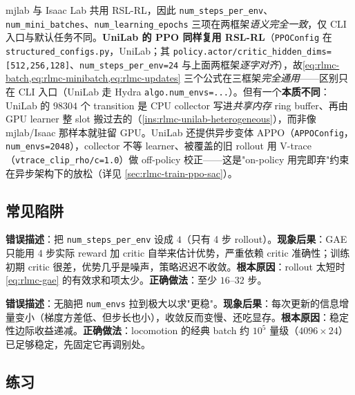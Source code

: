 mjlab 与 Isaac Lab 共用 RSL-RL，因此 \verb|num_steps_per_env|、\verb|num_mini_batches|、\verb|num_learning_epochs| 三项在两框架\emph{语义完全一致}，仅 CLI 入口与默认任务不同。\textbf{UniLab 的 PPO 同样复用 RSL-RL}（\verb|PPOConfig| 在 \verb|structured_configs.py|，UniLab；其 \verb|policy.actor/critic_hidden_dims=[512,256,128]|、\verb|num_steps_per_env=24| 与上面两框架\emph{逐字对齐}），故\cref{eq:rlmc-batch,eq:rlmc-minibatch,eq:rlmc-updates} 三个公式在三框架\emph{完全通用}——区别只在 CLI 入口（UniLab 走 Hydra \verb|algo.num_envs=...|）。但有一个\textbf{本质不同}：UniLab 的 $98304$ 个 transition 是 CPU collector 写进\emph{共享内存} ring buffer、再由 GPU learner 整 slot 搬过去的（\cref{ins:rlmc-unilab-heterogeneous}），而非像 mjlab/Isaac 那样本就驻留 GPU。UniLab 还提供异步变体 APPO（\verb|APPOConfig|，\verb|num_envs=2048|），collector 不等 learner、被覆盖的旧 rollout 用 V-trace（\verb|vtrace_clip_rho/c=1.0|）做 off-policy 校正——这是"on-policy 用完即弃"约束在异步架构下的放松（详见 \cref{sec:rlmc-train-ppo-sac}）。

\subsection{常见陷阱}

\begin{pitfall}
\textbf{错误描述}：把 \verb|num_steps_per_env| 设成 $4$（只有 4 步 rollout）。\textbf{现象后果}：GAE 只能用 4 步实际 reward 加 critic 自举来估计优势，严重依赖 critic 准确性；训练初期 critic 很差，优势几乎是噪声，策略迟迟不收敛。\textbf{根本原因}：rollout 太短时 \cref{eq:rlmc-gae} 的有效求和项太少。\textbf{正确做法}：至少 $16$--$32$ 步。
\end{pitfall}

\begin{pitfall}
\textbf{错误描述}：无脑把 \verb|num_envs| 拉到极大以求"更稳"。\textbf{现象后果}：每次更新的信息增量变小（梯度方差低、但步长也小），收敛反而变慢、还吃显存。\textbf{根本原因}：稳定性边际收益递减。\textbf{正确做法}：locomotion 的经典 batch 约 $10^5$ 量级（$4096\times24$）已足够稳定，先固定它再调别处。
\end{pitfall}

\subsection{练习}

